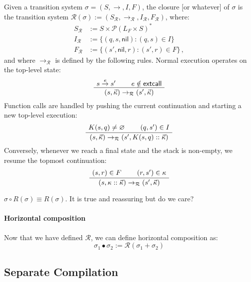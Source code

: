 \documentclass[sigplan,10pt,review,anonymous]{acmart}
\newcommand{\kw}[1]{\ensuremath{ \textsf{#1} }}
\begin{document}
\begin{definition}
Given a transition system $\sigma = (S, \rightarrow, I, F)$,
the closure [or whatever] of $\sigma$ is the transition system
$\mathcal{R}(\sigma) :=
  (S_\mathcal{R}, \rightarrow_\mathcal{R}, I_\mathcal{R}, F_\mathcal{R})$,
where:
\begin{align*}
  S_\mathcal{R} &:= S \times \mathcal{P}(L_F \times S)^* \\
  I_\mathcal{R} &:= \{ (q, s, \kw{nil}) : (q, s) \in I \} \\
  F_\mathcal{R} &:= \{ (s', \kw{nil}, r) : (s', r) \in F \} \,,
\end{align*}
and where $\rightarrow_\mathcal{R}$ is defined
by the following rules.
Normal execution operates on the top-level state:
\[
  \AxiomC{$s \stackrel{e}{\rightarrow} s'$}
  \AxiomC{$e \notin \kw{extcall}$}
  \BinaryInfC{$(s, \vec{\kappa}) \rightarrow_\mathcal{R} (s', \vec{\kappa})$}
  \DisplayProof
\]
Function calls are handled by pushing the current continuation
and starting a new top-level execution:
\[
  \AxiomC{$K(s, q) \ne \varnothing$}
  \AxiomC{$(q, s') \in I$}
  \BinaryInfC{$(s, \vec{\kappa}) \rightarrow_\mathcal{R} (s', K(s, q) :: \vec{\kappa})$}
  \DisplayProof
\]
Conversely,
whenever we reach a final state
and the stack is non-empty,
we resume the topmost continuation:
\[
  \AxiomC{$(s, r) \in F$}
  \AxiomC{$(r, s') \in \kappa$}
  \BinaryInfC{$(s, \kappa :: \vec{\kappa}) \rightarrow_\mathcal{R} (s', \vec{\kappa})$}
  \DisplayProof
\]
\end{definition}

\begin{theorem}
$\sigma \circ R(\sigma) \equiv R(\sigma)$.
It is true and reassuring but do we care?
\end{theorem}


\paragraph{Horizontal composition} %

Now that we have defined $\mathcal{R}$,
we can define horizontal composition as:
\[
  \sigma_1 \bullet \sigma_2 := \mathcal{R}(\sigma_1 + \sigma_2)
\]



\subsection{Separate Compilation} %
\end{document}
